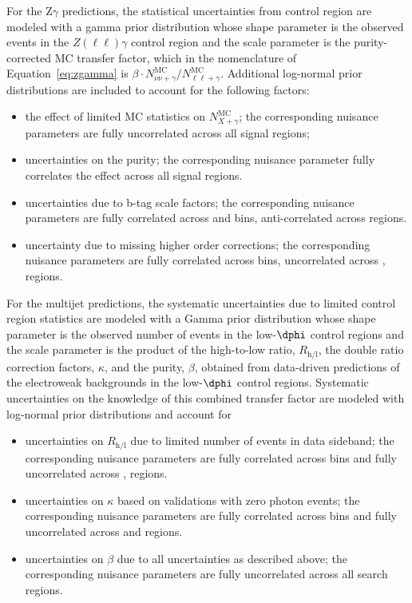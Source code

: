 For the Z$\gamma$ predictions, the statistical uncertainties from control 
region are modeled with a gamma
prior distribution whose shape parameter is the observed events in the 
$Z(\ell\ell)\gamma$ control region and the scale parameter is the 
purity-corrected MC transfer factor, which in the nomenclature of 
Equation~\ref{eq:zgamma} is 
$\beta\cdot N_{\nu\nu+\gamma}^{\mathrm{MC}}/N_{\ell\ell+\gamma}^{\mathrm{MC}}$.
Additional log-normal prior distributions are included to account 
for the following factors:
\begin{itemize}
 \item the effect of limited MC statistics on $N_{X+\gamma}^{\mathrm{MC}}$; the corresponding nuisance parameters are fully uncorrelated across all signal regions;
 \item uncertainties on the purity; the corresponding nuisance parameter fully correlates the effect across all signal regions.
 \item uncertainties due to b-tag scale factors; the corresponding nuisance parameters are fully correlated across \ptmiss and \nj bins, anti-correlated across \nb regions.
 \item uncertainty due to missing higher order corrections; the corresponding nuisance parameters are fully correlated across \ptmiss bins, uncorrelated across \nb, \nj regions.
\end{itemize}


For the multijet predictions, the systematic uncertainties due to limited 
control region statistics are modeled with a 
Gamma prior distribution whose shape parameter is the observed number
of events in the low-$\dphi$ control regions and the scale parameter
is the product of the high-to-low ratio, $R_{\mathrm{h/l}}$, the double ratio
correction factors, $\kappa$, and the purity, $\beta$, obtained from data-driven predictions
of the electroweak backgrounds in the low-$\dphi$ control regions. 
Systematic uncertainties on the knowledge of this combined transfer factor are 
modeled with log-normal prior distributions and account for

\begin{itemize}
 \item uncertainties on $R_{\mathrm{h/l}}$ due to limited number of events in data sideband; the corresponding nuisance parameters 
 are fully correlated across \ptmiss bins and fully uncorrelated across \nb, \nj regions.
 \item uncertainties on $\kappa$ based on validations with zero photon events; the corresponding nuisance parameters are fully 
   correlated across \ptmiss bins and fully uncorrelated across \nb and \nj regions.
 \item uncertainties on $\beta$ due to all uncertainties as described above; the corresponding nuisance parameters are 
  fully uncorrelated across all search regions.
\end{itemize} 

